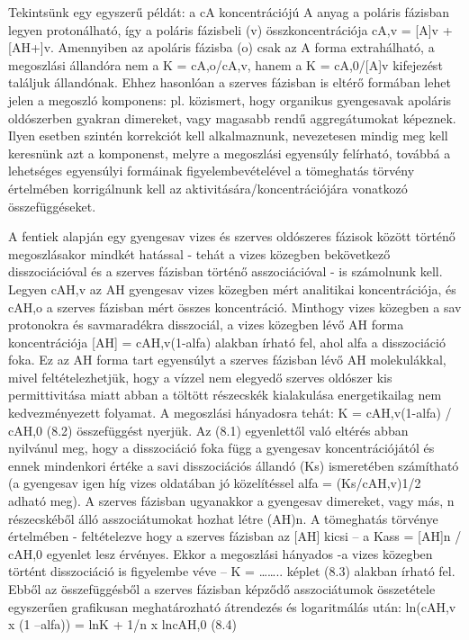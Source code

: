 Tekintsünk egy egyszerű példát: a cA koncentrációjú A anyag a poláris fázisban legyen protonálható, így a poláris fázisbeli (v) összkoncentrációja cA,v = [A]v + [AH+]v.
Amennyiben az apoláris fázisba (o) csak az A forma extrahálható, a megoszlási állandóra nem a K = cA,o/cA,v, hanem a K = cA,0/[A]v kifejezést találjuk állandónak.
Ehhez hasonlóan a szerves fázisban is eltérő formában lehet jelen a megoszló komponens: pl. közismert, hogy organikus gyengesavak apoláris oldószerben gyakran dimereket, vagy magasabb rendű aggregátumokat képeznek.
Ilyen esetben szintén korrekciót kell alkalmaznunk, nevezetesen mindig meg kell keresnünk azt a komponenst, melyre a megoszlási egyensúly felírható, továbbá a lehetséges egyensúlyi formáinak figyelembevételével a tömeghatás törvény értelmében korrigálnunk kell az aktivitására/koncentrációjára vonatkozó összefüggéseket.

A fentiek alapján egy gyengesav vizes és szerves oldószeres fázisok között történő megoszlásakor mindkét hatással - tehát a vizes közegben bekövetkező disszociációval és a szerves fázisban történő asszociációval - is számolnunk kell.
Legyen cAH,v az AH gyengesav vizes közegben mért analitikai koncentrációja, és cAH,o a szerves fázisban mért összes koncentráció.
Minthogy vizes közegben a sav protonokra és savmaradékra disszociál, a vizes közegben lévő AH forma koncentrációja [AH] = cAH,v(1-alfa) alakban írható fel, ahol alfa a disszociáció foka.
Ez az AH forma tart egyensúlyt a szerves fázisban lévő AH molekulákkal, mivel feltételezhetjük, hogy a vízzel nem elegyedő szerves oldószer kis permittivitása miatt abban a töltött részecskék kialakulása energetikailag nem kedvezményezett folyamat.
A megoszlási hányadosra tehát:
K = cAH,v(1-alfa) / cAH,0                   (8.2)
összefüggést nyerjük.
Az (8.1) egyenlettől való eltérés abban nyilvánul meg, hogy a disszociáció foka függ a gyengesav koncentrációjától és ennek mindenkori értéke a savi disszociációs állandó (Ks) ismeretében számítható (a gyengesav igen híg vizes oldatában jó közelítéssel alfa = (Ks/cAH,v)1/2 adható meg).
A szerves fázisban ugyanakkor a gyengesav dimereket, vagy más, n részecskéből álló asszociátumokat hozhat létre (AH)n.
A tömeghatás törvénye értelmében - feltételezve hogy a szerves fázisban az [AH] kicsi – a 
Kass = [AH]n / cAH,0
egyenlet lesz érvényes.
Ekkor a megoszlási hányados -a vizes közegben történt disszociáció is figyelembe véve –
K = …….. képlet                                  (8.3)
alakban írható fel.
Ebből az összefüggésből a szerves fázisban képződő asszociátumok összetétele egyszerűen grafikusan meghatározható átrendezés és logaritmálás után:
ln(cAH,v x (1 –alfa)) = lnK + 1/n x lncAH,0                                (8.4)

